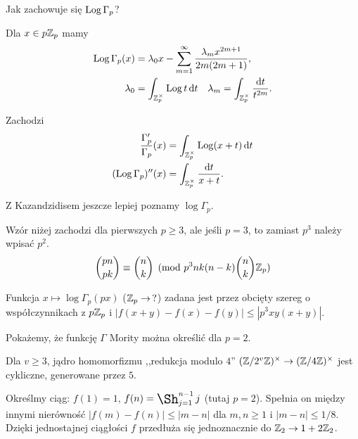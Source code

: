 Jak zachowuje się $\operatorname{Log} \Gamma_p$?

\begin{fakt}
	Dla $x \in p \mathbb Z_p$ mamy
	\begin{align*}
	\operatorname{Log} \Gamma_p (x) & = \lambda_0 x - \sum_{m =1}^\infty \frac{\lambda_m x^{2m+1}}{2m(2m+1)}, \\
	\lambda_0 & = \int_{\mathbb Z_p^\times} \operatorname{Log} t \,\textrm{d}t \quad \lambda_m = \int_{\mathbb Z_p^\times} \frac{\textrm{d}t}{t^{2m}}.
	\end{align*}
\end{fakt}

\begin{wniosek}
	Zachodzi
	\begin{align*}
	\frac{\Gamma_p'}{\Gamma_p}(x) & = \int_{\mathbb Z_p^\times} \operatorname{Log} (x+t) \,\textrm{d}t \\
	(\operatorname{Log} \Gamma_p)'' (x) & = \int_{\mathbb Z_p^\times} \frac{\textrm{d}t}{x+t}.
	\end{align*}
\end{wniosek}

Z  Kazandzidisem jeszcze lepiej poznamy $\log \Gamma_p$.

\begin{twierdzenie}[Kazandzidis]
	Wzór niżej zachodzi dla pierwszych $p \ge 3$, ale jeśli $p = 3$, to zamiast $p^3$ należy wpisać $p^2$.
	\[
		{pn \choose pk} \equiv {n \choose k} \pmod {p^3nk(n-k) {n \choose k}\mathbb Z_p}
	\]
\end{twierdzenie}

\begin{fakt}
	Funkcja $x \mapsto \log \Gamma_p (px)$ ($\mathbb Z_p \to \, ?$) zadana jest przez obcięty szereg o współczynnikach z $p \mathbb Z_p$ i
	$|f(x + y) - f(x) - f(y)| \le |p^3xy(x+y)|$.
\end{fakt}

Pokażemy,  że funkcję $\Gamma$ Mority można określić dla $p = 2$.

\begin{fakt}
	Dla $v \ge 3$, jądro homomorfizmu ,,redukcja modulo $4$'' $(\mathbb Z/2^v \mathbb Z)^\times \to (\mathbb Z / 4 \mathbb Z)^\times$ jest cykliczne, generowane przez $5$.
\end{fakt}

Określmy ciąg: $f(1) = 1$, $f(n) = \shaprod_{j=1}^{n-1} j$ (tutaj $p = 2$).
Spełnia on między innymi nierówność $|f(m) - f(n)| \le |m-n|$ dla $m,n \ge 1$ i $|m-n| \le 1/8$.
Dzięki jednostajnej ciągłości $f$ przedłuża się jednoznacznie do $\mathbb Z_2 \to 1+2\mathbb Z_2$.


